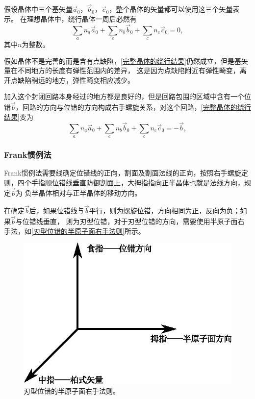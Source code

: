                         假设晶体中三个基矢量$\vec{a}_0$，$\vec{b}_0$，$\vec{c}_0$，整个晶体的矢量都可以使用这三个矢量表示。
                        在理想晶体中，绕行晶体一周后必然有
                        \begin{equation}
                            \sum_{a}n_a\vec{a}_0+\sum_{c}n_b\vec{b}_0+\sum_{c}n_c\vec{c}_0=0\label{完整晶体的绕行结果},
                        \end{equation}
                        其中$n$为整数。

                        假如晶体不是完善的而是含有点缺陷，\autoref{完整晶体的绕行结果}仍然成立，但是基矢量在不同地方的长度有弹性范围内的差异，
                        这是因为点缺陷附近有弹性畸变，离开点缺陷稍远的地方，弹性畸变相应减少。

                        加入这个封闭回路本身经过的地方都是良好的，但是回路包围的区域中含有一个位错$\vec{b}$，回路的方向与位错的方向构成右手螺旋关系，对这个回路，\autoref{完整晶体的绕行结果}变为
                        \begin{equation}
                            \sum_{a}n_a\vec{a}_0+\sum_{c}n_b\vec{b}_0+\sum_{c}n_c\vec{c}_0=-\vec{b},                            
                        \end{equation}

                    \subsubsection{Frank惯例法}
                        Frank惯例法需要线确定位错线的正向，割面及割面法线的正向，按照右手螺旋定则，四个手指顺位错线垂直防御割面上，大拇指指向正半晶体也就是法线方向，规定$\vec{b}$为
                        负半晶体相对与正半晶体的移动方向。

                        在确定$\vec{b}$后，如果位错线与$\vec{b}$平行，则为螺旋位错，方向相同为正，反向为负；如果$\vec{b}$与位错线垂直，
                        则为刃型位错，对于刃型位错的方向，需要使用半原子面右手法，如\autoref{刃型位错的半原子面右手法则}所示。
                        \begin{figure}[ht]
                            \centering
                            \includegraphics[scale=1]{fig/right_hand_rule_of_edge_dislocation.eps}
                            \caption{刃型位错的半原子面右手法则。}
                            \label{刃型位错的半原子面右手法则}
                        \end{figure}

